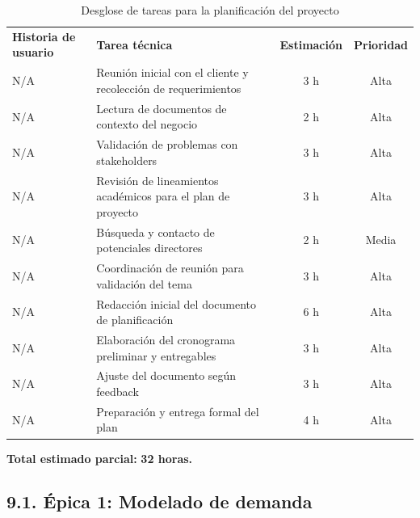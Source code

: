 \documentclass[
11pt, %
]{charter}
\begin{document}
\begin{table}[H]
\centering
\begin{tabular}{|l|p{6cm}|c|c|}
\hline
\textbf{Historia de usuario} & \textbf{Tarea técnica} & \textbf{Estimación} & \textbf{Prioridad} \\
N/A & Reunión inicial con el cliente y recolección de requerimientos & 3 h & Alta \\
N/A & Lectura de documentos de contexto del negocio & 2 h & Alta \\
N/A & Validación de problemas con stakeholders & 3 h & Alta \\
N/A & Revisión de lineamientos académicos para el plan de proyecto & 3 h & Alta \\
N/A & Búsqueda y contacto de potenciales directores & 2 h & Media \\
N/A & Coordinación de reunión para validación del tema & 3 h & Alta \\
N/A & Redacción inicial del documento de planificación & 6 h & Alta \\
N/A & Elaboración del cronograma preliminar y entregables & 3 h & Alta \\
N/A & Ajuste del documento según feedback & 3 h & Alta \\
N/A & Preparación y entrega formal del plan & 4 h & Alta \\
\hline
\end{tabular}
\caption{Desglose de tareas para la planificación del proyecto}
\end{table}

\vspace{0.5cm}
\noindent
\textbf{Total estimado parcial:} \textbf{32 horas.}

\subsection*{9.1. Épica 1: Modelado de demanda}
\end{document}
